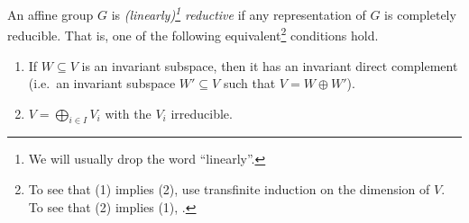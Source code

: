 \begin{definition}
 An affine group $G$ is \emph{(linearly)\footnote{We will usually drop the word ``linearly''.} reductive} if any representation of $G$ is completely reducible. That is, one of the following equivalent\footnote{To see that (1) implies (2), use transfinite induction on the dimension of $V$. To see that (2) implies (1), .} conditions hold.
 \begin{enumerate}
  \item If $W\subseteq V$ is an invariant subspace, then it has an invariant direct complement (i.e.~an invariant subspace $W'\subseteq V$ such that $V=W\oplus W'$).
  \item $V= \bigoplus_{i\in I}V_i$ with the $V_i$ irreducible.\qedhere
 \end{enumerate}
\end{definition}
